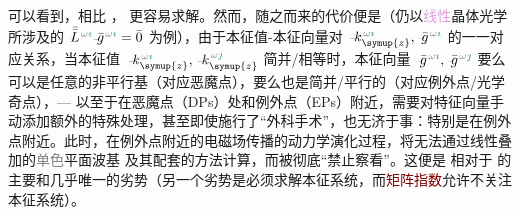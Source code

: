 可以看到，相比 ，  更容易求解。然而，随之而来的代价便是（仍以\textcolor{Plum}{线性}\textcolor{PineGreen}{晶体光学}所涉及的 $\Xint{\mathcolor{gray}{-}}{30}{\bar{\bar{L}}}^{\;\! \mathcolor{gray}{\omega} \textcolor{PineGreen}{\imath}} \Xint{{}^{}_{\mathcolor{gray}{-}}}{10}{\bar{g}}^{\;\!\mathcolor{gray}{\omega} \textcolor{PineGreen}{\imath}} = \bar{0}$ 为例），由于\textcolor{PineGreen}{本征值}-\textcolor{PineGreen}{本征向量}对 $\Xint{\begin{smallmatrix} ~ \\ {}^{}_{\mathcolor{gray}{-}} \\ ~ \end{smallmatrix}}{15}{k}_{\symup{z}}^{\;\! \mathcolor{gray}{\omega} \textcolor{PineGreen}{\imath}}, \Xint{{}^{}_{\mathcolor{gray}{-}}}{10}{\bar{g}}^{\;\!\mathcolor{gray}{\omega} \textcolor{PineGreen}{\imath}}$ 的一一对应关系，当\textcolor{PineGreen}{本征值} $\Xint{\begin{smallmatrix} ~ \\ {}^{}_{\mathcolor{gray}{-}} \\ ~ \end{smallmatrix}}{15}{k}_{\symup{z}}^{\;\! \mathcolor{gray}{\omega} \textcolor{PineGreen}{\imath}}, \Xint{\begin{smallmatrix} ~ \\ {}^{}_{\mathcolor{gray}{-}} \\ ~ \end{smallmatrix}}{15}{k}_{\symup{z}}^{\;\! \mathcolor{gray}{\omega} \textcolor{PineGreen}{\jmath}}$ 简并/相等时，\textcolor{PineGreen}{本征向量} $\Xint{{}^{}_{\mathcolor{gray}{-}}}{10}{\bar{g}}^{\;\!\mathcolor{gray}{\omega} \textcolor{PineGreen}{\imath}}, \Xint{{}^{}_{\mathcolor{gray}{-}}}{10}{\bar{g}}^{\;\!\mathcolor{gray}{\omega} \textcolor{PineGreen}{\jmath}}$ 要么可以是任意的非平行基（对应\textcolor{PineGreen}{恶魔点}），要么也是简并/平行的（对应\textcolor{PineGreen}{例外点}/\textcolor{PineGreen}{光学奇点}），--- 以至于在\textcolor{PineGreen}{恶魔点}（\textcolor{PineGreen}{DPs}）处和\textcolor{PineGreen}{例外点}（\textcolor{PineGreen}{EPs}）附近，需要对\textcolor{PineGreen}{特征向量}手动添加额外的特殊处理，甚至即使施行了“外科手术”，也无济于事：特别是在\textcolor{PineGreen}{例外点}附近。此时，在\textcolor{PineGreen}{例外点}附近的电磁场传播的动力学演化过程，将无法通过\textcolor{PineGreen}{线性叠加}的\textcolor{gray}{单色}\textcolor{PineGreen}{平面波基}  及其配套的方法计算，而被彻底“禁止察看”。这便是  相对于  的主要和几乎唯一的劣势（另一个劣势是必须求解\textcolor{PineGreen}{本征系统}，而\textcolor{Maroon}{矩阵指数}允许不关注\textcolor{PineGreen}{本征系统}\cite{zarifiPlaneWaveReflection2014}）。

